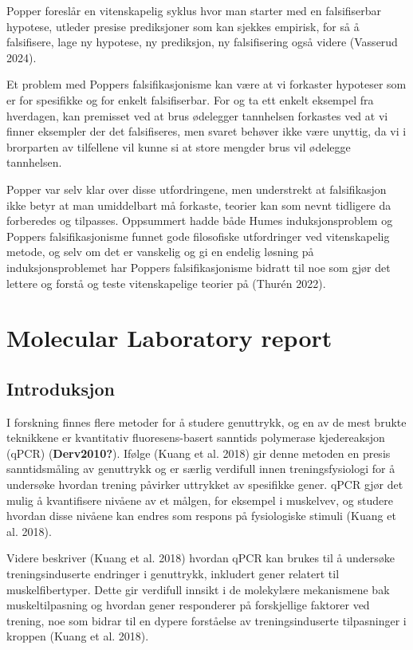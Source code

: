 \documentclass[
  letterpaper,
  DIV=11,
  numbers=noendperiod]{scrreprt}
\begin{document}
Popper foreslår en vitenskapelig syklus hvor man starter med en
falsifiserbar hypotese, utleder presise prediksjoner som kan sjekkes
empirisk, for så å falsifisere, lage ny hypotese, ny prediksjon, ny
falsifisering også videre (Vasserud 2024).

Et problem med Poppers falsifikasjonisme kan være at vi forkaster
hypoteser som er for spesifikke og for enkelt falsifiserbar. For og ta
ett enkelt eksempel fra hverdagen, kan premisset ved at brus ødelegger
tannhelsen forkastes ved at vi finner eksempler der det falsifiseres,
men svaret behøver ikke være unyttig, da vi i brorparten av tilfellene
vil kunne si at store mengder brus vil ødelegge tannhelsen.

Popper var selv klar over disse utfordringene, men understrekt at
falsifikasjon ikke betyr at man umiddelbart må forkaste, teorier kan som
nevnt tidligere da forberedes og tilpasses. Oppsummert hadde både Humes
induksjonsproblem og Poppers falsifikasjonisme funnet gode filosofiske
utfordringer ved vitenskapelig metode, og selv om det er vanskelig og gi
en endelig løsning på induksjonsproblemet har Poppers falsifikasjonisme
bidratt til noe som gjør det lettere og forstå og teste vitenskapelige
teorier på (Thurén 2022).


\chapter{Molecular Laboratory report}\label{molecular-laboratory-report}

\section{Introduksjon}\label{introduksjon-3}

I forskning finnes flere metoder for å studere genuttrykk, og en av de
mest brukte teknikkene er kvantitativ fluoresens-basert sanntids
polymerase kjedereaksjon (qPCR) (\textbf{Derv2010?}). Ifølge (Kuang et
al. 2018) gir denne metoden en presis sanntidsmåling av genuttrykk og er
særlig verdifull innen treningsfysiologi for å undersøke hvordan trening
påvirker uttrykket av spesifikke gener. qPCR gjør det mulig å
kvantifisere nivåene av et målgen, for eksempel i muskelvev, og studere
hvordan disse nivåene kan endres som respons på fysiologiske stimuli
(Kuang et al. 2018).

Videre beskriver (Kuang et al. 2018) hvordan qPCR kan brukes til å
undersøke treningsinduserte endringer i genuttrykk, inkludert gener
relatert til muskelfibertyper. Dette gir verdifull innsikt i de
molekylære mekanismene bak muskeltilpasning og hvordan gener responderer
på forskjellige faktorer ved trening, noe som bidrar til en dypere
forståelse av treningsinduserte tilpasninger i kroppen (Kuang et al.
2018).
\end{document}
